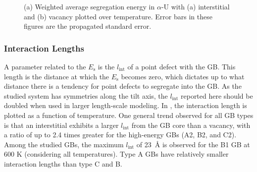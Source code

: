 \documentclass[review]{elsarticle}
\begin{document}
\begin{figure}[h!]
\centering
{} 
\caption{(a) Weighted average segregation energy in $\alpha$-U with (a) interstitial and (b) vacancy plotted over temperature. Error bars in these figures are the propagated standard error. }
\label{fig:SE}
\end{figure}


\FloatBarrier

\subsubsection{Interaction Lengths}
\par A parameter related to the $E_{\mathrm{s}}$ is the  $l_{\mathrm{int}}$ of a point defect with the GB. This length is the distance at which the $E_{\mathrm{s}}$ becomes zero, which dictates up to what distance there is a tendency for point defects to segregate into the GB. As the studied system has symmetries along the tilt axis, the $l_{\mathrm{int}}$ reported here should be doubled when used in larger length-scale modeling. In , the interaction length is plotted as a function of temperature. One general trend observed for all GB types is that an interstitial exhibits a larger  $l_{\mathrm{int}}$ from the GB core than a vacancy, with a ratio of up to 2.4 times greater for the high-energy GBs (A2, B2, and C2). Among the studied GBs, the maximum  $l_{\mathrm{int}}$ of 23~{\AA} is observed for the B1 GB at 600 K (considering all temperatures). Type A GBs have relatively smaller interaction lengths than type C and B. 
\end{document}
